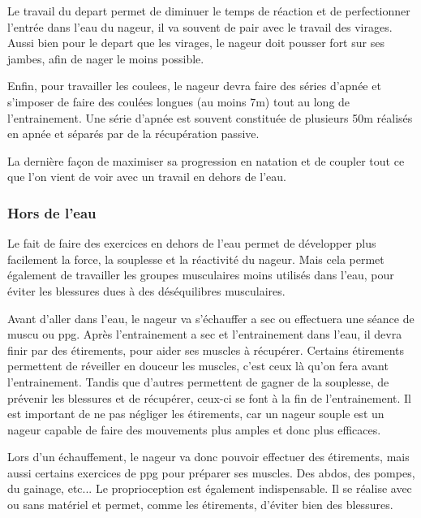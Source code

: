 \vspace{12pt}

Le travail du \gls{depart} permet de diminuer le temps de réaction et de perfectionner l'entrée dans l'eau du nageur, il va souvent de pair avec le travail des \gls{virages}. Aussi bien pour le \gls{depart} que les \gls{virages}, le nageur doit pousser fort sur ses jambes, afin de nager le moins possible.

Enfin, pour travailler les \gls{coulees}, le nageur devra faire des séries d'apnée et s'imposer de faire des coulées longues (au moins 7m) tout au long de l'entrainement. Une série d'apnée est souvent constituée de plusieurs 50m réalisés en apnée et séparés par de la récupération passive.

La dernière façon de maximiser sa progression en natation et de coupler tout ce que l'on vient de voir avec un travail en dehors de l'eau.


\subsubsection{Hors de l'eau}

Le fait de faire des exercices en dehors de l'eau permet de développer plus facilement la force, la souplesse et la réactivité du nageur. Mais cela permet également de travailler les groupes musculaires moins utilisés dans l'eau, pour éviter les blessures dues à des déséquilibres musculaires.

Avant d'aller dans l'eau, le nageur va s'échauffer \gls{a sec} ou effectuera une séance de muscu ou ppg. Après l'entrainement \gls{a sec} et l'entrainement dans l'eau, il devra finir par des étirements, pour aider ses muscles à récupérer. Certains étirements permettent de réveiller en douceur les muscles, c'est ceux là qu'on fera avant l'entrainement. Tandis que d'autres permettent de gagner de la souplesse, de prévenir les blessures et de récupérer, ceux-ci se font à la fin de l'entrainement. Il est important de ne pas négliger les étirements, car un nageur souple est un nageur capable de faire des mouvements plus amples et donc plus efficaces.

\vspace{12pt}

Lors d'un échauffement, le nageur va donc pouvoir effectuer des étirements, mais aussi certains exercices de ppg pour préparer ses muscles. Des abdos, des pompes, du gainage, etc... Le \gls{proprioception} est également indispensable. Il se réalise avec ou sans matériel et permet, comme les étirements, d'éviter bien des blessures.

